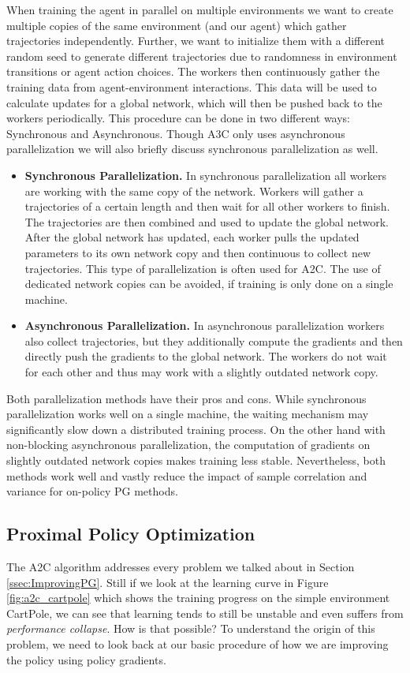 When training the agent in parallel on multiple environments we want to create multiple copies of the same environment (and our agent) which gather trajectories independently. Further, we want to initialize them with a different random seed to generate different trajectories due to randomness in environment transitions or agent action choices. The workers then continuously gather the training data from agent-environment interactions. This data will be used to calculate updates for a global network, which will then be pushed back to the workers periodically. This procedure can be done in two different ways: Synchronous and Asynchronous. Though A3C only uses asynchronous parallelization we will also briefly discuss synchronous parallelization as well.
\begin{itemize}
  \item \textbf{Synchronous Parallelization.} In synchronous parallelization all workers are working with the same copy of the network. Workers will gather a trajectories of a certain length and then wait for all other workers to finish. The trajectories are then combined and used to update the global network. After the global network has updated, each worker pulls the updated parameters to its own network copy and then continuous to collect new trajectories. This type of parallelization is often used for A2C. The use of dedicated network copies can be avoided, if training is only done on a single machine.
  \item \textbf{Asynchronous Parallelization.} In asynchronous parallelization workers also collect trajectories, but they additionally compute the gradients and then directly push the gradients to the global network. The workers do not wait for each other and thus may work with a slightly outdated network copy. 
\end{itemize}
Both parallelization methods have their pros and cons. While synchronous parallelization works well on a single machine, the waiting mechanism may significantly slow down a distributed training process. On the other hand with non-blocking asynchronous parallelization, the computation of gradients on slightly outdated network copies makes training less stable. Nevertheless, both methods work well and vastly reduce the impact of sample correlation and variance for on-policy PG methods. 


\subsection{Proximal Policy Optimization} \label{ssec:PPO}
The A2C algorithm addresses every problem we talked about in Section \ref{ssec:ImprovingPG}. Still if we look at the learning curve in Figure \ref{fig:a2c_cartpole} which shows the training progress on the simple environment CartPole, we can see that learning tends to still be unstable and even suffers from \textit{performance collapse}. How is that possible? To understand the origin of this problem, we need to look back at our basic procedure of how we are improving the policy using policy gradients.

